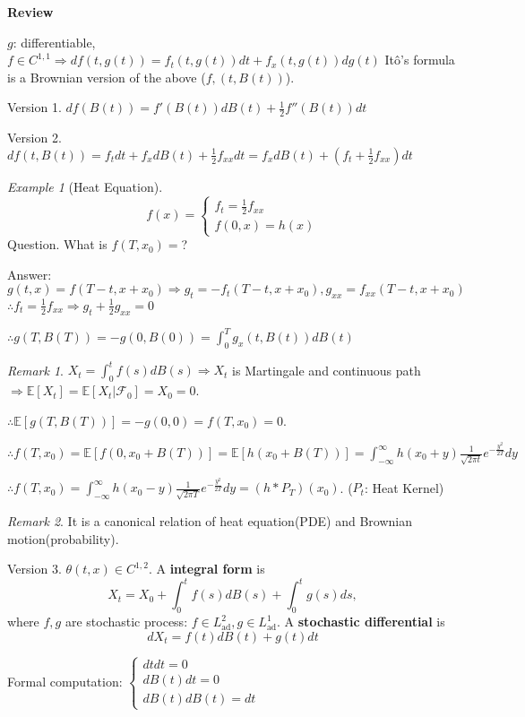 \documentclass[12pt]{report}
\newcommand{\F}{\mathcal{F}}
\newcommand{\E}{\mathbb{E}}
\renewcommand{\1}{\mathbb{1}}
\theoremstyle{break}
\theoremstyle{newdef}
\theoremstyle{remark}
\newtheorem*{exmp}{Example} %
\newtheorem*{rem}{Remark} %
\begin{document}
\textbf{Review}

$g$: differentiable, $f \in C^{1,1} \Rightarrow df(t,g(t)) = f_t(t,g(t))dt + f_x(t,g(t))dg(t)$
It\^o's formula is a Brownian version of the above ($f,(t,B(t))$).


Version 1.
$df(B(t)) = f'(B(t))dB(t) + \frac{1}{2} f''(B(t))dt$

Version 2.
$df(t,B(t)) = f_tdt + f_xdB(t) + \frac12f_{xx}dt = f_xdB(t) + (f_t+\frac12f_{xx})dt$


\begin{exmp}[Heat Equation]
$$
f(x) = 
\begin{cases}
f_t = \frac12 f_{xx}\\
f(0,x) = h(x)
\end{cases}
$$
Question. What is $f(T,x_0) = $?

Answer: $g(t,x) = f(T-t, x+x_0) \Rightarrow g_t = -f_t(T-t, x+x_0), g_{xx} = f_{xx}(T-t,x+x_0)$
$\therefore f_t = \frac12 f_{xx} \Rightarrow g_t + \frac12 g_{xx} = 0$

$\therefore g(T,B(T)) = -g(0,B(0)) = \int_0^T g_x(t,B(t))dB(t)$

\begin{rem}
$X_t = \int_0^t f(s)dB(s) \Rightarrow X_t$ is Martingale and continuous path $\Rightarrow \E[X_t] = \E[X_t | \F_0] = X_0 = 0$.
\end{rem}
\end{exmp}

$\therefore \E[g(T,B(T))] = -g(0,0) = f(T,x_0) = 0$.

$\therefore f(T,x_0) = \E[f(0,x_0+B(T))] = \E[h(x_0+B(T))] = \int_{-\infty}^\infty h(x_0 + y) \frac{1}{\sqrt{2\pi t}} e^{-\frac{y^2}{2T}}dy$

$\therefore f(T,x_0) = \int_{-\infty}^\infty h(x_0 - y) \frac{1}{\sqrt{2\pi T}} e^{-\frac{y^2}{2T}}dy
= (h * P_T)(x_0)$. ($P_t$: Heat Kernel)

\begin{rem}
It is a canonical relation of heat equation(PDE) and Brownian motion(probability).
\end{rem}


Version 3.
$\theta(t,x) \in C^{1,2}$. A \textbf{integral form} is
$$
X_t = X_0 + \int_0^t f(s)dB(s) + \int_0^t g(s)ds,
$$
where $f,g$ are stochastic process: $f \in L^2_{\text{ad}}, g \in L^1_\text{ad}$.
A \textbf{stochastic differential} is
$$
dX_t = f(t)dB(t) + g(t)dt
$$



Formal computation:
$
\begin{cases}
dtdt = 0\\
dB(t)dt = 0\\
dB(t)dB(t) = dt
\end{cases}
$
\end{document}
